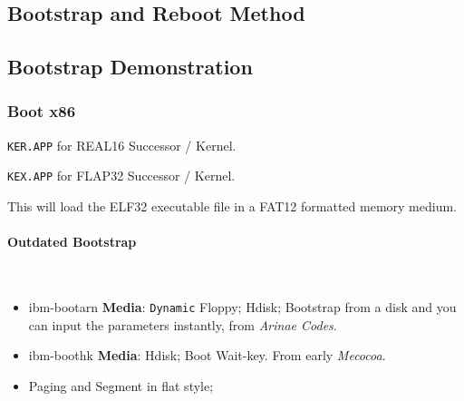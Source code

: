 

\subsection{Bootstrap and Reboot Method}



\subsection{Bootstrap Demonstration}



\subsubsection{Boot x86}

\verb|KER.APP| for REAL16 Successor / Kernel.

\verb|KEX.APP| for FLAP32 Successor / Kernel.

This will load the ELF32 executable file in a FAT12 formatted memory medium.



\paragraph{Outdated Bootstrap} \

\begin{itemize}

\item ibm-bootarn \textbf{Media}: \verb|Dynamic| Floppy; Hdisk;
Bootstrap from a disk and you can input the parameters instantly, from \textit{Arinae Codes}.

\item ibm-boothk \textbf{Media}: Hdisk;
Boot Wait-key. From early \textit{Mecocoa}.

\end{itemize}

\begin{itemize}

\item Paging and Segment in flat style;
\end{itemize}

